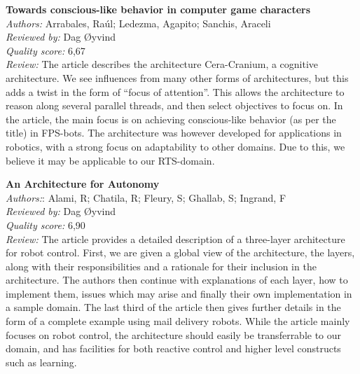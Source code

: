 
\textbf{Towards conscious-like behavior in computer game characters}\\
\textit{Authors:} Arrabales, Ra\'{u}l; Ledezma, Agapito; Sanchis, Araceli\\
\textit{Reviewed by:} Dag {\O}yvind\\
\textit{Quality score:} 6,67\\
\textit{Review:} The article describes the architecture Cera-Cranium, a cognitive architecture.  We see influences from many other forms of architectures, but this adds a twist in the form of ``focus of attention''.  This allows the architecture to reason along several parallel threads, and then select objectives to focus on.  In the article, the main focus is on achieving conscious-like behavior (as per the title) in FPS-bots.  The architecture was however developed for applications in robotics, with a strong focus on adaptability to other domains.  Due to this, we believe it may be applicable to our RTS-domain.


\textbf{An Architecture for Autonomy}\\
\textit{Authors:}: Alami, R; Chatila, R; Fleury, S; Ghallab, S; Ingrand, F\\
\textit{Reviewed by:} Dag {\O}yvind\\
\textit{Quality score:} 6,90\\
\textit{Review:} The article provides a detailed description of a three-layer architecture for robot control.  First, we are given a global view of the architecture, the layers, along with their responsibilities and a rationale for their inclusion in the architecture.  The authors then continue with explanations of each layer, how to implement them, issues which may arise and finally their own implementation in a sample domain.  The last third of the article then gives further details in the form of a complete example using mail delivery robots.  While the article mainly focuses on robot control, the architecture should easily be transferrable to our domain, and has facilities for both reactive control and higher level constructs such as learning.

